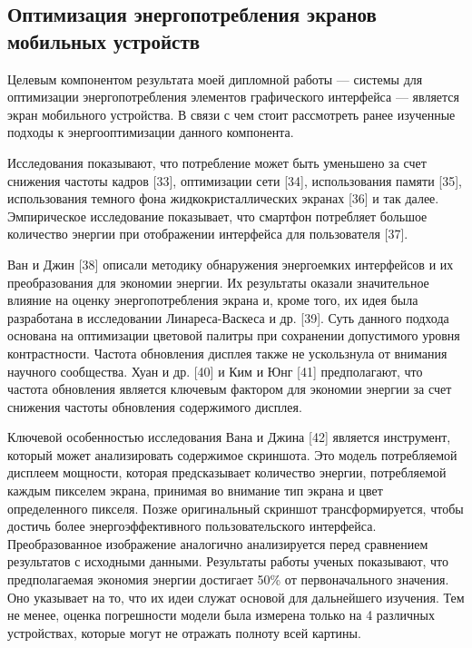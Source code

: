 \documentclass[a4paper,14pt]{extarticle} %
\begin{document}
	\subsection{Оптимизация энергопотребления экранов мобильных устройств}
	
	Целевым компонентом результата моей дипломной работы — системы для оптимизации энергопотребления элементов графического интерфейса — является экран мобильного устройства. В связи с чем стоит рассмотреть ранее изученные подходы к энергооптимизации данного компонента.
	
	Исследования показывают, что потребление может быть уменьшено за счет снижения частоты кадров [33], оптимизации сети [34], использования памяти [35], использования темного фона жидкокристаллических экранах [36] и так далее. Эмпирическое исследование показывает, что смартфон потребляет большое количество энергии при отображении интерфейса для пользователя [37]. 
	
	Ван и Джин [38] описали методику обнаружения энергоемких интерфейсов и их преобразования для экономии энергии. Их результаты оказали значительное влияние на оценку энергопотребления экрана и, кроме того, их идея была разработана в исследовании Линареса-Васкеса и др. [39]. Суть данного подхода основана на оптимизации цветовой палитры при сохранении допустимого уровня контрастности. Частота обновления дисплея также не ускользнула от внимания научного сообщества. Хуан и др. [40] и Ким и Юнг [41] предполагают, что частота обновления является ключевым фактором для экономии энергии за счет снижения частоты обновления содержимого дисплея.
	
	Ключевой особенностью исследования Вана и Джина [42] является инструмент, который может анализировать содержимое скриншота. Это модель потребляемой дисплеем мощности, которая предсказывает количество энергии, потребляемой каждым пикселем экрана, принимая во внимание тип экрана и цвет определенного пикселя. Позже оригинальный скриншот трансформируется, чтобы достичь более энергоэффективного пользовательского интерфейса. Преобразованное изображение аналогично анализируется перед сравнением результатов с исходными данными. Результаты работы ученых показывают, что предполагаемая экономия энергии достигает 50\% от первоначального значения. Оно указывает на то, что их идеи служат основой для дальнейшего изучения. Тем не менее, оценка погрешности модели была измерена только на 4 различных устройствах, которые могут не отражать полноту всей картины.
	
\end{document}
